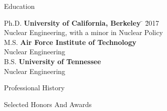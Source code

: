 \documentclass{resume2} %
\begin{document}

\begin{rSection}{Education}

\begin{tabbing}
Ph.D. \hspace*{2 em}\= \textbf{University of California, Berkeley} \hspace*{5em} \= \hspace*{15em} \= 2017 \\
      \> Nuclear Engineering, with a minor in Nuclear Policy \\
%
M.S. \hspace*{2 em}\> \textbf{Air Force Institute of Technology} \>  \\
      \> Nuclear Engineering\\
%
B.S. \hspace*{2 em}\> \textbf{University of Tennessee} \>  \\
      \> Nuclear Engineering
\end{tabbing}
\end{rSection}

\begin{rSection}{Professional History}

\end{rSection}

\begin{rSection}{Selected Honors And Awards}

\end{rSection}

%

%
\end{document}
